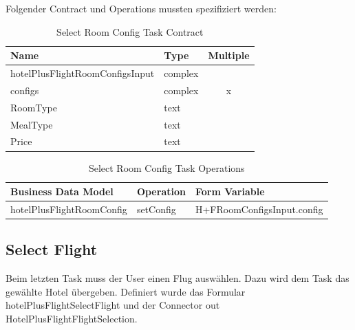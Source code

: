 Folgender Contract und Operations mussten spezifiziert werden:
\begin{table}[H] 
	\caption{Select Room Config Task Contract}
	\centering
	
	\begin{tabular}{ | l | l | c | } 
		\hline
		\textbf{Name} & \textbf{Type} & \textbf{Multiple} \\ \hline 
		hotelPlusFlightRoomConfigsInput & complex & \\ \hline
		\hspace*{5mm}configs & complex & x \\ \hline
		\hspace*{10mm}RoomType & text & \\ \hline
		\hspace*{10mm}MealType & text & \\ \hline
		\hspace*{10mm}Price & text & \\ \hline
	\end{tabular} 
\end{table}
\begin{table}[H] 
	\caption{Select Room Config Task Operations}
	\centering
	
	\begin{tabular}{ | l | l | l | } 
		\hline
		\textbf{Business Data Model} & \textbf{Operation} & \textbf{Form Variable} \\ \hline 
		hotelPlusFlightRoomConfig & setConfig & H+FRoomConfigsInput.config \\ \hline
	\end{tabular} 
\end{table}

\subsection{Select Flight}
Beim letzten Task muss der User einen Flug auswählen. Dazu wird dem Task das gewählte Hotel übergeben. Definiert wurde das Formular hotelPlusFlightSelectFlight und der Connector out HotelPlusFlightFlightSelection.

